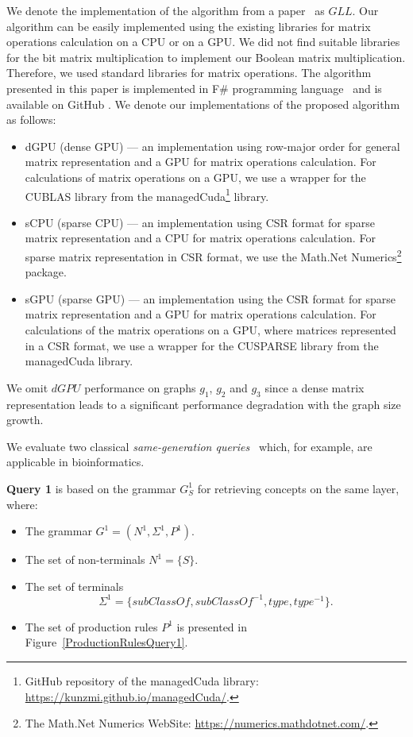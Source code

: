 We denote the implementation of the algorithm from a paper~\cite{GLL} as $GLL$. Our algorithm can be easily implemented using the existing libraries for matrix operations calculation on a CPU or on a GPU. We did not find suitable libraries for the bit matrix multiplication to implement our Boolean matrix multiplication. Therefore, we used standard libraries for matrix operations. The algorithm presented in this paper is implemented in F\# programming language~\cite{fsharp} and is available on GitHub%
. We denote our implementations of the proposed algorithm as follows:
\begin{itemize}
    \item dGPU (dense GPU) --- an implementation using row-major order for general matrix representation and a GPU for matrix operations calculation. For calculations of matrix operations on a GPU, we use a wrapper for the CUBLAS library from the managedCuda\footnote{GitHub repository of the managedCuda library: \url{https://kunzmi.github.io/managedCuda/}.} library.
    \item sCPU (sparse CPU) --- an implementation using CSR format for sparse matrix representation and a CPU for matrix operations calculation. For sparse matrix representation in CSR format, we use the Math.Net Numerics\footnote{The Math.Net Numerics WebSite: \url{https://numerics.mathdotnet.com/}.} package.
    \item sGPU (sparse GPU) --- an implementation using the CSR format for sparse matrix representation and a GPU for matrix operations calculation. For calculations of the matrix operations on a GPU, where matrices represented in a CSR format, we use a wrapper for the CUSPARSE library from the managedCuda library.
\end{itemize}

We omit $dGPU$ performance on graphs $g_1$, $g_2$ and $g_3$ since a dense matrix representation leads to a significant performance degradation with the graph size growth. 

We evaluate two classical \textit{same-generation queries}~\cite{FndDB} which, for example, are applicable in bioinformatics.

\textbf{Query 1} is based on the grammar $G^1_S$ for retrieving concepts on the same layer, where:
\begin{itemize}
    \item The grammar $G^1 = (N^1, \Sigma^1, P^1)$.
    \item The set of non-terminals $N^1 = \{S\}$.
    \item The set of terminals $$\Sigma^1 = \{subClassOf, subClassOf^{-1}, type, type^{-1}\}.$$
    \item The set of production rules $P^1$ is presented in Figure~\ref{ProductionRulesQuery1}.
\end{itemize}

